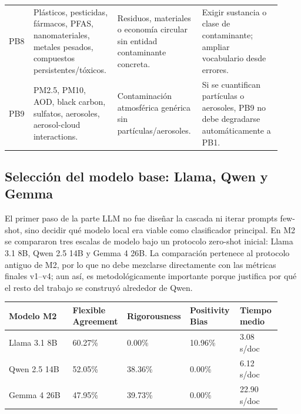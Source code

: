 \begin{center}
\begin{tabular}{p{0.08\linewidth}p{0.27\linewidth}p{0.28\linewidth}p{0.29\linewidth}}
PB8 & Plásticos, pesticidas, fármacos, PFAS, nanomateriales, metales pesados, compuestos persistentes/tóxicos. & Residuos, materiales o economía circular sin entidad contaminante concreta. & Exigir sustancia o clase de contaminante; ampliar vocabulario desde errores. \\
PB9 & PM2.5, PM10, AOD, black carbon, sulfatos, aerosoles, aerosol-cloud interactions. & Contaminación atmosférica genérica sin partículas/aerosoles. & Si se cuantifican partículas o aerosoles, PB9 no debe degradarse automáticamente a PB1. \\
\bottomrule
\end{tabular}
\end{center}

\subsection{Selección del modelo base: Llama, Qwen y Gemma}

El primer paso de la parte LLM no fue diseñar la cascada ni iterar prompts few-shot, sino decidir qué modelo local era viable como clasificador principal. En M2 se compararon tres escalas de modelo bajo un protocolo zero-shot inicial: Llama 3.1 8B, Qwen 2.5 14B y Gemma 4 26B. La comparación pertenece al protocolo antiguo de M2, por lo que no debe mezclarse directamente con las métricas finales v1--v4; aun así, es metodológicamente importante porque justifica por qué el resto del trabajo se construyó alrededor de Qwen.

\begin{center}
\scriptsize
\setlength{\tabcolsep}{5pt}
\renewcommand{\arraystretch}{1.15}
\begin{tabular}{p{0.23\linewidth}p{0.18\linewidth}p{0.18\linewidth}p{0.18\linewidth}p{0.15\linewidth}}
\toprule
Modelo M2 & Flexible Agreement & Rigorousness & Positivity Bias & Tiempo medio \\
\midrule
Llama 3.1 8B & 60.27\% & 0.00\% & 10.96\% & 3.08 s/doc \\
Qwen 2.5 14B & 52.05\% & 38.36\% & 0.00\% & 6.12 s/doc \\
Gemma 4 26B & 47.95\% & 39.73\% & 0.00\% & 22.90 s/doc \\
\bottomrule
\end{tabular}
\end{center}

